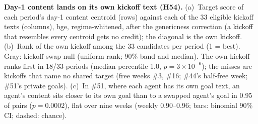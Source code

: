 \caption{\textbf{Day-1 content lands on its own kickoff text (H54).}
(a)~Target score of each period's day-1 content centroid (rows) against each of the 33 eligible kickoff texts (columns), bge, regime-whitened, after the genericness correction (a kickoff that resembles every centroid gets no credit); the diagonal is the own kickoff.
(b)~Rank of the own kickoff among the 33 candidates per period (1 = best). Gray: kickoff-swap null (uniform rank; 90\% band and median). The own kickoff ranks first in 18/33 periods (median percentile 1.0, $p=3\times10^{-6}$); the misses are kickoffs that name no shared target (free weeks \#3, \#16; \#44's half-free week; \#51's private goals).
(c)~In \#51, where each agent has its own goal text, an agent's content sits closer to its own goal than to a swapped agent's goal in 0.95 of pairs ($p=0.0002$), flat over nine weeks (weekly 0.90--0.96; bars: binomial 90\% CI; dashed: chance).}
\label{fig:H54}
